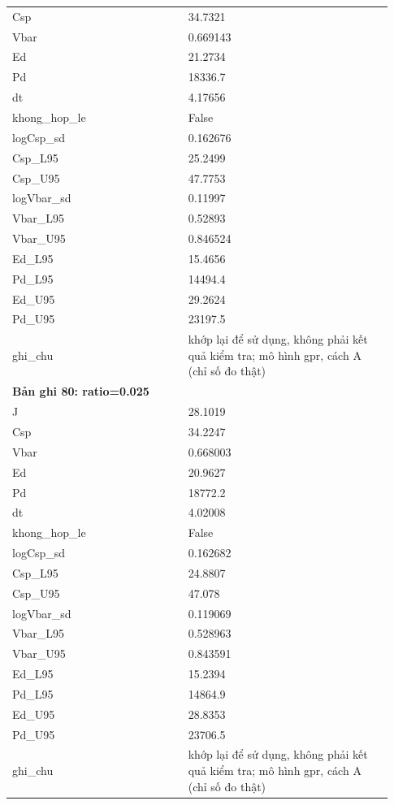 \begin{longtable}{p{0.43\linewidth}p{0.50\linewidth}}
Csp & 34.7321 \\
Vbar & 0.669143 \\
Ed & 21.2734 \\
Pd & 18336.7 \\
dt & 4.17656 \\
khong\_\allowbreak hop\_\allowbreak le & False \\
logCsp\_\allowbreak sd & 0.162676 \\
Csp\_\allowbreak L95 & 25.2499 \\
Csp\_\allowbreak U95 & 47.7753 \\
logVbar\_\allowbreak sd & 0.11997 \\
Vbar\_\allowbreak L95 & 0.52893 \\
Vbar\_\allowbreak U95 & 0.846524 \\
Ed\_\allowbreak L95 & 15.4656 \\
Pd\_\allowbreak L95 & 14494.4 \\
Ed\_\allowbreak U95 & 29.2624 \\
Pd\_\allowbreak U95 & 23197.5 \\
ghi\_\allowbreak chu & khớp lại để sử dụng, không phải kết quả kiểm tra; mô hình gpr, cách A (chỉ số đo thật) \\
\midrule
\multicolumn{2}{p{0.95\linewidth}}{\textbf{Bản ghi 80: ratio=0.025}} \\
J & 28.1019 \\
Csp & 34.2247 \\
Vbar & 0.668003 \\
Ed & 20.9627 \\
Pd & 18772.2 \\
dt & 4.02008 \\
khong\_\allowbreak hop\_\allowbreak le & False \\
logCsp\_\allowbreak sd & 0.162682 \\
Csp\_\allowbreak L95 & 24.8807 \\
Csp\_\allowbreak U95 & 47.078 \\
logVbar\_\allowbreak sd & 0.119069 \\
Vbar\_\allowbreak L95 & 0.528963 \\
Vbar\_\allowbreak U95 & 0.843591 \\
Ed\_\allowbreak L95 & 15.2394 \\
Pd\_\allowbreak L95 & 14864.9 \\
Ed\_\allowbreak U95 & 28.8353 \\
Pd\_\allowbreak U95 & 23706.5 \\
ghi\_\allowbreak chu & khớp lại để sử dụng, không phải kết quả kiểm tra; mô hình gpr, cách A (chỉ số đo thật) \\

\end{longtable}
